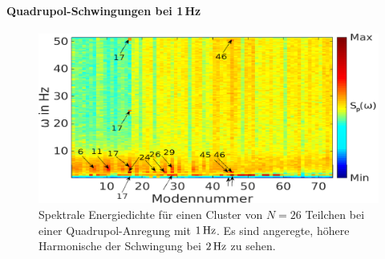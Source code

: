         \paragraph{Quadrupol-Schwingungen bei 1\,Hz}

            \begin{figure}[!b]
              \centering
              \includegraphics[width=\textwidth]{figs/auswertung/manipulation/quadrupol1Hzpowerdens.png}
              \caption{Spektrale Energiedichte für einen Cluster von $N=26$ Teilchen bei einer Quadrupol-Anregung mit $\unit[1]{Hz}$. Es sind angeregte, höhere Harmonische der Schwingung bei $\unit[2]{Hz}$ zu sehen.}\label{img:powerdensquadrupol1Hz}
            \end{figure}

